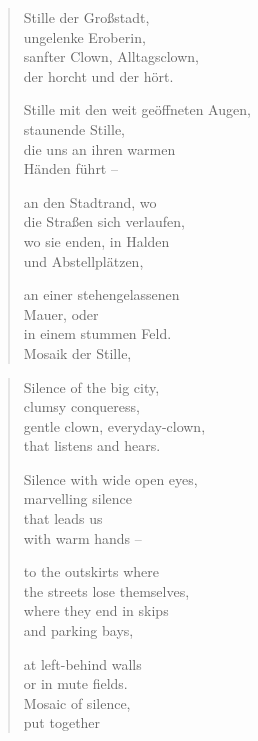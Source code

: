 
\cleartoverso



\begin{verse}

Stille der Großstadt,\\
ungelenke Eroberin,\\
sanfter Clown, Alltagsclown,\\
der horcht und der hört.

Stille mit den weit geöffneten Augen,\\
staunende Stille,\\
die uns an ihren warmen\\
Händen führt --

an den Stadtrand, wo\\
die Straßen sich verlaufen,\\
wo sie enden, in Halden\\
und Abstellplätzen,

an einer stehengelassenen\\
Mauer, oder\\
in einem stummen Feld.\\
Mosaik der Stille,
\end{verse}

\clearpage



\begin{verse}

Silence of the big city,\\
clumsy conqueress,\\
gentle clown, everyday-clown,\\
that listens and hears.

Silence with wide open eyes,\\
marvelling silence\\
that leads us\\
with warm hands --

to the outskirts where\\
the streets lose themselves,\\
where they end in skips\\
and parking bays,

at left-behind walls\\
or in mute fields.\\
Mosaic of silence,\\
put together
\end{verse}

